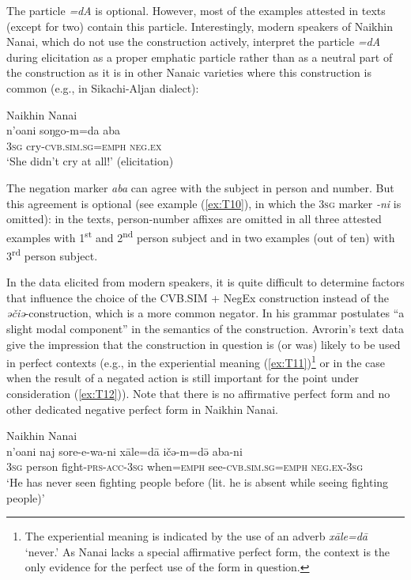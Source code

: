 \documentclass[output=paper]{langscibook}
\begin{document}
The particle \textit{=dA} is optional. However, most of the examples attested in texts (except for two) contain this particle. Interestingly, modern speakers of Naikhin Nanai, which do not use the construction actively, interpret the particle \textit{=dA} during elicitation as a proper emphatic particle rather than as a neutral part of the construction as it is in other Nanaic varieties where this construction is common (e.g., in Sikachi-Aljan dialect):

\ea Naikhin Nanai \label{ex:T10}\\
	\gll n’oani	soŋgo-m=da	aba\\
	\textsc{3sg}	cry-\textsc{cvb.sim.sg=emph}	\textsc{neg.ex}\\
	\glt `She didn’t cry at all!' (elicitation)
\z

The negation marker \textit{aba} can agree with the subject in person and number. But this agreement is optional (see example (\ref{ex:T10}), in which the \textsc{3sg} marker \textit{-ni} is omitted): in the texts, person-number affixes are omitted in all three attested examples with 1\textsuperscript{st} and 2\textsuperscript{nd} person subject and in two examples (out of ten) with 3\textsuperscript{rd} person subject.

In the data elicited from modern speakers, it is quite difficult to determine factors that influence the choice of the CVB.SIM + NegEx construction instead of the \textit{əčiə}-construction, which is a more common negator. In his grammar \citet[108]{avrorin1961a} postulates “a slight modal component” in the semantics of the  construction. Avrorin’s text data give the impression that the construction in question is (or was) likely to be used in perfect contexts (e.g., in the experiential meaning (\ref{ex:T11})\footnote{The experiential meaning is indicated by the use of an adverb \textit{xāle=dā} ‘never.’ As Nanai lacks a special affirmative perfect form, the context is the only evidence for the perfect use of the form in question.} or in the case when the result of a negated action is still important for the point under consideration (\ref{ex:T12})). Note that there is no affirmative perfect form and no other dedicated negative perfect form in Naikhin Nanai.

\ea Naikhin Nanai \label{ex:T11}\\
	\gll n’oani	naj	sore-e-wa-ni	xāle=dā	ičə-m=də̄	aba-ni\\
	\textsc{3sg}	person	fight-\textsc{prs-acc-3sg}	when=\textsc{emph}	see-\textsc{cvb.sim.sg=emph}	\textsc{neg.ex-3sg}\\
	\glt `He has never seen fighting people before (lit. he is absent while seeing fighting people)' \citep[154, text]{avrorin1986a}
\z
\end{document}
